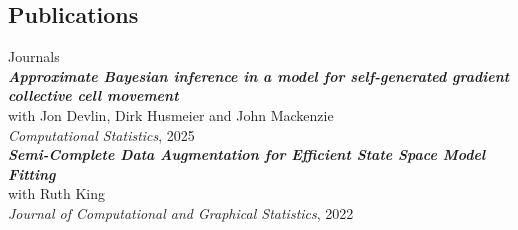 \documentclass[margin,line]{resume}
\begin{document}
\begin{resume}
\section{\mysidestyle Publications}
{\mysidestyle Journals\vspace{1mm}}\\
%
\textit{\textbf{Approximate Bayesian inference in a model for self-generated gradient collective cell movement}}\\
	with Jon Devlin, Dirk Husmeier and John Mackenzie\\
    \textit{Computational Statistics}, 2025 \vspace{2mm} \\ 
%
\textit{\textbf{Semi-Complete Data Augmentation for Efficient State Space Model Fitting}}\\ 
    with Ruth King \\
    \textit{Journal of Computational and Graphical Statistics}, 2022 \vspace{2mm} \\   
%

\newpage



\end{resume}
\end{document}
